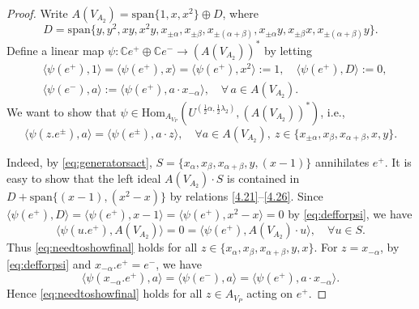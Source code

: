\documentclass[12pt,a4paper,reqno]{amsart}
\numberwithin{equation}{section}
\numberwithin{equation}{section}
\theoremstyle{definition}
\def \C {\mathbb{C}}
\def \Hom {\mathrm{Hom}}
\begin{document}
\begin{proof}
			
			Write $A(V_{A_2}) = \mathrm{span}\{1, x, x^2\} \oplus D$, where 
			\[
			D = \mathrm{span}\{y, y^2, xy, x^2y, x_{\pm\alpha}, x_{\pm\beta}, x_{\pm(\alpha+\beta)}, 
			x_{\pm\alpha}y, x_{\pm\beta}x, x_{\pm(\alpha+\beta)}y\}.
			\]
			Define a linear map 
			$\psi : \C e^+ \oplus \C e^- \to (A(V_{A_2}))^{\ast}$ by letting
			\begin{equation}\label{eq:defforpsi}
				\begin{aligned}
					&\langle \psi(e^+), 1 \rangle = \langle \psi(e^+), x \rangle 
					= \langle \psi(e^+), x^2 \rangle := 1, 
					\quad \langle \psi(e^+), D \rangle := 0,\\
					&\langle \psi(e^-), a \rangle := \langle \psi(e^+), a \cdot x_{-\alpha} \rangle, 
					\quad \forall\, a \in A(V_{A_2}).
				\end{aligned}
			\end{equation}
			We want to show that 
			$\psi \in \Hom_{A_{V_P}}(U^{(\frac{1}{2}\alpha, \frac{1}{2}\lambda_2)}, (A(V_{A_2}))^{\ast})$, 
			i.e.,
			\begin{equation}\label{eq:needtoshowfinal}
				\langle \psi(z.e^{\pm}), a \rangle 
				= \langle \psi(e^{\pm}), a \cdot z \rangle, 
				\quad \forall a \in A(V_{A_2}),\ z \in \{x_{\pm \alpha}, x_{\beta}, x_{\alpha+\beta}, x, y\}.
			\end{equation}
			
			
			Indeed, by \eqref{eq:generatorsact}, 
			$S = \{x_{\alpha}, x_{\beta}, x_{\alpha+\beta}, y, (x - 1)\}$ annihilates $e^+$. 
			It is easy to show that the left ideal $A(V_{A_2}) \cdot S$ 
			is contained in $D + \mathrm{span}\{(x - 1), (x^2 - x)\}$ 
			by relations \eqref{4.21}--\eqref{4.26}. 
			Since $\langle \psi(e^+), D \rangle 
			= \langle \psi(e^+), x - 1 \rangle 
			= \langle \psi(e^+), x^2 - x \rangle = 0$ by \eqref{eq:defforpsi}, 
			we have
			\[
			\langle \psi(u.e^+), A(V_{A_2}) \rangle = 0 
			= \langle \psi(e^+), A(V_{A_2}) \cdot u \rangle, 
			\quad \forall u \in S.
			\]
			Thus \eqref{eq:needtoshowfinal} holds for all $z \in \{x_{\alpha}, x_{\beta}, x_{\alpha+\beta}, y, x\}$. 
			For $z = x_{-\alpha}$, by \eqref{eq:defforpsi} and $x_{-\alpha}.e^+ = e^-$, 
			we have 
			\[
			\langle \psi(x_{-\alpha}.e^+), a \rangle 
			= \langle \psi(e^-), a \rangle 
			= \langle \psi(e^+), a \cdot x_{-\alpha} \rangle.
			\]
			Hence \eqref{eq:needtoshowfinal} holds for all $z \in A_{V_P}$ acting on $e^+$.
			

\end{proof}
\end{document}
